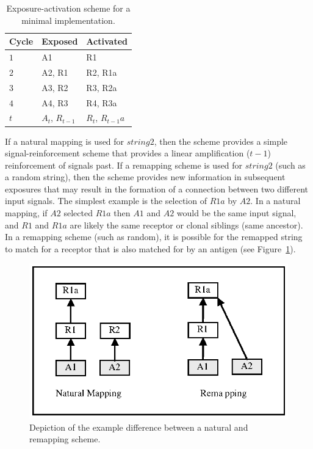 \begin{table}[ht]
	\centering\small
		\begin{tabular}{lll}
		\toprule
		\textbf{Cycle} & \textbf{Exposed} & \textbf{Activated} \\ 
		\toprule
		$1$ & A1 & R1 \\ 
		\midrule
		$2$ & A2, R1 & R2, R1a \\ 
		\midrule
		$3$ & A3, R2 & R3, R2a  \\ 
		\midrule
		$4$ & A4, R3 & R4, R3a \\ 
		\midrule
		$t$ & $A_t$, $R_{t-1}$ & $R_t$, $R_{t-1}a$ \\ 
		\bottomrule
		\end{tabular}	
	\caption{Exposure-activation scheme for a minimal implementation.}
	\label{tab:cells:network:activationscheme}
\end{table}

If a natural mapping is used for $string2$, then the scheme provides a simple signal-reinforcement scheme that provides a linear amplification ($t-1$) reinforcement of signals past. If a remapping scheme is used for $string2$ (such as a random string), then the scheme provides new information in subsequent exposures that may result in the formation of a connection between two different input signals. The simplest example is the selection of $R1a$ by $A2$. In a natural mapping, if $A2$ selected $R1a$ then $A1$ and $A2$ would be the same input signal, and $R1$ and $R1a$ are likely the same receptor or clonal siblings (same ancestor). In a remapping scheme (such as random), it is possible for the remapped string to match for a receptor that is also matched for by an antigen (see Figure~\ref{pic:cells:network:remapping}). 

\begin{figure}[ht]
	\centering
	\includegraphics[scale=0.85]{Cells/network-remapping-schemes}
	\caption{Depiction of the example difference between a natural and remapping scheme.}
	\label{pic:cells:network:remapping}
\end{figure}

